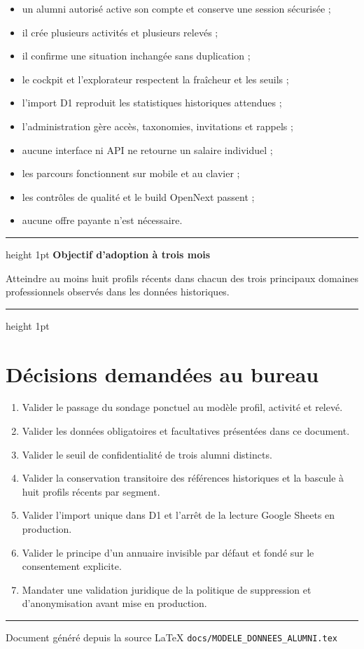 \documentclass[11pt,a4paper]{article}
\newenvironment{keybox}[1]{%
  \begin{center}
  \begin{minipage}{0.95\textwidth}
  \color{Primary}\hrule height 1pt
  \vspace{2mm}
  \textbf{\color{Primary}#1}\par\smallskip
  \color{Dark}
}{%
  \par\smallskip
  \color{Primary}\hrule height 1pt
  \end{minipage}
  \end{center}
}
\begin{document}
\begin{itemize}
  \item un alumni autorisé active son compte et conserve une session sécurisée ;
  \item il crée plusieurs activités et plusieurs relevés ;
  \item il confirme une situation inchangée sans duplication ;
  \item le cockpit et l'explorateur respectent la fraîcheur et les seuils ;
  \item l'import D1 reproduit les statistiques historiques attendues ;
  \item l'administration gère accès, taxonomies, invitations et rappels ;
  \item aucune interface ni API ne retourne un salaire individuel ;
  \item les parcours fonctionnent sur mobile et au clavier ;
  \item les contrôles de qualité et le build OpenNext passent ;
  \item aucune offre payante n'est nécessaire.
\end{itemize}

\begin{keybox}{Objectif d'adoption à trois mois}
Atteindre au moins huit profils récents dans chacun des trois principaux
domaines professionnels observés dans les données historiques.
\end{keybox}

\section{Décisions demandées au bureau}

\begin{enumerate}
  \item Valider le passage du sondage ponctuel au modèle profil, activité et
        relevé.
  \item Valider les données obligatoires et facultatives présentées dans ce
        document.
  \item Valider le seuil de confidentialité de trois alumni distincts.
  \item Valider la conservation transitoire des références historiques et la
        bascule à huit profils récents par segment.
  \item Valider l'import unique dans D1 et l'arrêt de la lecture Google Sheets
        en production.
  \item Valider le principe d'un annuaire invisible par défaut et fondé sur le
        consentement explicite.
  \item Mandater une validation juridique de la politique de suppression et
        d'anonymisation avant mise en production.
\end{enumerate}

\vfill
\begin{center}
  \color{MidGray}
  \rule{0.45\textwidth}{0.4pt}

  \small Document généré depuis la source LaTeX
  \texttt{docs/MODELE\_DONNEES\_ALUMNI.tex}
\end{center}
\end{document}
